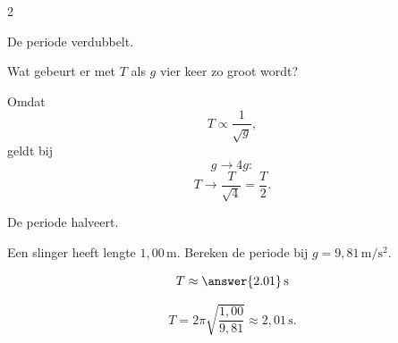 \documentclass{ximera}
\begin{document}
\begin{oefening}{\oefU\ESS}
\begin{multicols}{2}
\begin{question}
\begin{oplossing}
De periode verdubbelt.
\end{oplossing}
\end{question}


\begin{question}
Wat gebeurt er met $T$ als $g$ vier keer zo groot wordt?

\begin{oplossing}
Omdat
\[
T\propto\frac1{\sqrt g},
\]
geldt bij
\[
g\to4g:
\]
\[
T\to\frac{T}{\sqrt4}
=\frac T2.
\]

De periode halveert.
\end{oplossing}
\end{question}


\begin{question}
Een slinger heeft lengte $1{,}00\,\mathrm m$.
Bereken de periode bij $g=9{,}81\,\mathrm{m/s^2}$.

\[
T\approx\answer{2.01}\,\mathrm s
\]

\begin{oplossing}
\[
T
=2\pi\sqrt{\frac{1{,}00}{9{,}81}}
\approx2{,}01\,\mathrm s.
\]
\end{oplossing}
\end{question}

\end{multicols}

\end{oefening}

\end{document}

